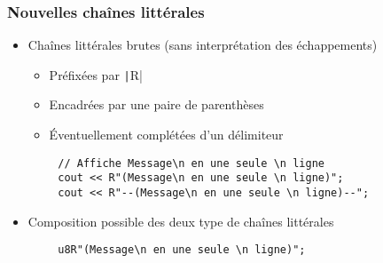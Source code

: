 \documentclass[C++.tex]{subfiles}
\begin{document}
\begin{frame}[fragile]
	\frametitle{Nouvelles chaînes littérales}
	\begin{itemize}
		\item Chaînes littérales brutes (sans interprétation des échappements)


		\begin{itemize}
			\item Préfixées par \texttt|R|
			\item Encadrées par une paire de parenthèses
			\item Éventuellement complétées d'un délimiteur
		\end{itemize}
	\end{itemize}

	\begin{verbatim}
		// Affiche Message\n en une seule \n ligne
		cout << R"(Message\n en une seule \n ligne)";
		cout << R"--(Message\n en une seule \n ligne)--";
	\end{verbatim}

	\begin{itemize}
		\item Composition possible des deux type de chaînes littérales
	\end{itemize}

	\begin{verbatim}
		u8R"(Message\n en une seule \n ligne)";
	\end{verbatim}


\end{frame}
\end{document}
